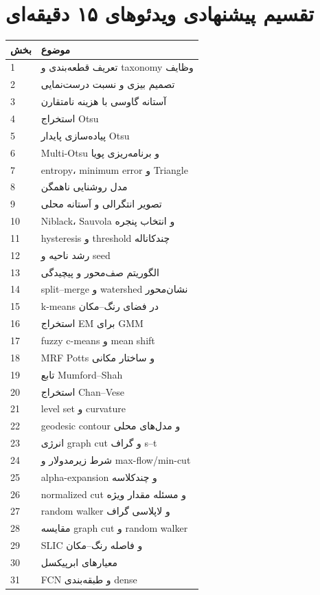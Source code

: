 \documentclass[12pt,openany,oneside]{book}
\begin{document}
\section{تقسیم پیشنهادی ویدئوهای ۱۵ دقیقه‌ای}
\begin{longtable}{p{12mm}p{115mm}}
\toprule
بخش & موضوع \\
\midrule
1 & تعریف قطعه‌بندی و taxonomy وظایف \\
2 & تصمیم بیزی و نسبت درست‌نمایی \\
3 & آستانه گاوسی با هزینه نامتقارن \\
4 & استخراج Otsu \\
5 & پیاده‌سازی پایدار Otsu \\
6 & Multi-Otsu و برنامه‌ریزی پویا \\
7 & entropy، minimum error و Triangle \\
8 & مدل روشنایی ناهمگن \\
9 & تصویر انتگرالی و آستانه محلی \\
10 & Niblack، Sauvola و انتخاب پنجره \\
11 & hysteresis و threshold چندکاناله \\
12 & رشد ناحیه و seed \\
13 & الگوریتم صف‌محور و پیچیدگی \\
14 & split--merge و watershed نشان‌محور \\
15 & k-means در فضای رنگ--مکان \\
16 & استخراج EM برای GMM \\
17 & fuzzy c-means و mean shift \\
18 & MRF Potts و ساختار مکانی \\
19 & تابع Mumford--Shah \\
20 & استخراج Chan--Vese \\
21 & level set و curvature \\
22 & geodesic contour و مدل‌های محلی \\
23 & انرژی graph cut و گراف s--t \\
24 & شرط زیرمدولار و max-flow/min-cut \\
25 & alpha-expansion و چندکلاسه \\
26 & normalized cut و مسئله مقدار ویژه \\
27 & random walker و لاپلاسی گراف \\
28 & مقایسه graph cut و random walker \\
29 & SLIC و فاصله رنگ--مکان \\
30 & معیارهای ابرپیکسل \\
31 & FCN و طبقه‌بندی dense \\

\end{longtable}
\end{document}

